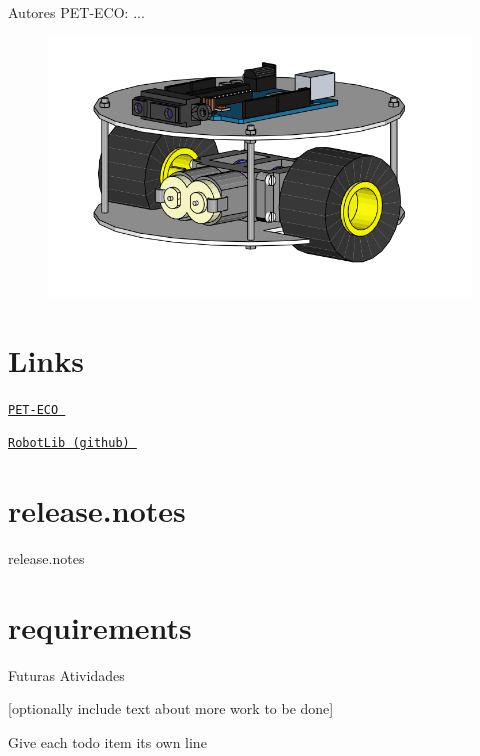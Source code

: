 \begin{DoxyAuthor}{Autores}
P\-E\-T-\/\-E\-C\-O\-: ...
\end{DoxyAuthor}


\begin{figure}[htb]
	\centering
	\includegraphics[width=.8\textwidth]{img/modelo3d.png}
\end{figure}


 \hypertarget{index_Links}{}\section{Links}\label{index_Links}
\href{http://dainf.ct.utfpr.edu.br/peteco/}{\tt P\-E\-T-\/\-E\-C\-O } 

\href{https://github.com/anderson-/RobotLib}{\tt Robot\-Lib (github) } 



 \hypertarget{index_notes}{}\section{release.\-notes}\label{index_notes}
release.\-notes 

 \hypertarget{index_requirements}{}\section{requirements}\label{index_requirements}

\begin{DoxyVerbInclude}
\end{DoxyVerbInclude}
 

 \begin{DoxyRefDesc}{Futuras Atividades}
\item[\hyperlink{todo__todo000001}{Futuras Atividades}]\mbox{[}optionally include text about more work to be done\mbox{]} 

Give each todo item its own line\end{DoxyRefDesc}
